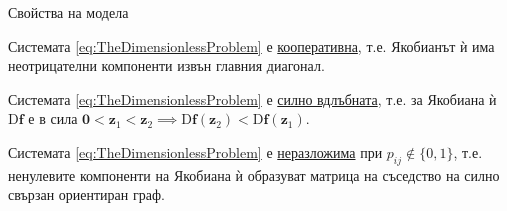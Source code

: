 \begin{frame}[t]{Свойства на модела}
  \begin{proposition}
    Системата \eqref{eq:TheDimensionlessProblem} е \underline{кооперативна}, т.е. Якобианът ѝ има неотрицателни компоненти извън главния диагонал.
  \end{proposition}

  \begin{proposition}
    Системата \eqref{eq:TheDimensionlessProblem} е \underline{силно вдлъбната}, т.е. за Якобиана ѝ $\mathrm{D}\boldsymbol{f}$ е в сила $\pmb{0} < \boldsymbol{z}_1 < \boldsymbol{z}_2 \implies \mathrm{D}\boldsymbol{f}(\boldsymbol{z}_2) < \mathrm{D}\boldsymbol{f}(\boldsymbol{z}_1)$.
  \end{proposition}

  \begin{proposition}
    Системата \eqref{eq:TheDimensionlessProblem} е \underline{неразложима} при $p_{ij} \notin \{0, 1\}$, т.е. ненулевите компоненти на Якобиана ѝ образуват матрица на съседство на силно свързан ориентиран граф.
  \end{proposition}
\end{frame}


